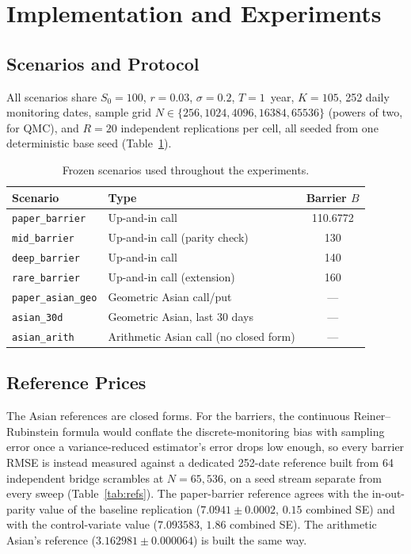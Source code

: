 \documentclass[sigconf]{acmart}
\begin{document}
\section{Implementation and Experiments}

\subsection{Scenarios and Protocol}
All scenarios share $S_0{=}100$, $r{=}0.03$, $\sigma{=}0.2$, $T{=}1$~year,
$K{=}105$, 252 daily monitoring dates, sample grid $N\in\{256, 1024, 4096,
16384, 65536\}$ (powers of two, for QMC), and $R=20$ independent replications
per cell, all seeded from one deterministic base seed
(Table~\ref{tab:scenarios}).

\begin{table}[t]
\caption{Frozen scenarios used throughout the experiments.}
\label{tab:scenarios}
\small
\begin{tabular}{llc}
\toprule
\textbf{Scenario} & \textbf{Type} & \textbf{Barrier $B$} \\
\midrule
\texttt{paper\_barrier} & Up-and-in call & 110.6772 \\
\texttt{mid\_barrier} & Up-and-in call (parity check) & 130 \\
\texttt{deep\_barrier} & Up-and-in call & 140 \\
\texttt{rare\_barrier} & Up-and-in call (extension) & 160 \\
\texttt{paper\_asian\_geo} & Geometric Asian call/put & --- \\
\texttt{asian\_30d} & Geometric Asian, last 30 days & --- \\
\texttt{asian\_arith} & Arithmetic Asian call (no closed form) & --- \\
\bottomrule
\end{tabular}
\end{table}

\subsection{Reference Prices}
\label{sec:refs}
The Asian references are closed forms. For the barriers, the continuous
Reiner--Rubinstein formula would conflate the discrete-monitoring bias with
sampling error once a variance-reduced estimator's error drops low enough, so
every barrier RMSE is instead measured against a dedicated 252-date reference
built from 64 independent bridge scrambles at $N=65{,}536$, on a seed stream
separate from every sweep (Table~\ref{tab:refs}). The paper-barrier reference
agrees with the in-out-parity value of the baseline replication
($7.0941\pm0.0002$, $0.15$ combined SE) and with the control-variate value
($7.093583$, $1.86$ combined SE). The arithmetic Asian's reference
($3.162981\pm0.000064$) is built the same way.
\end{document}
